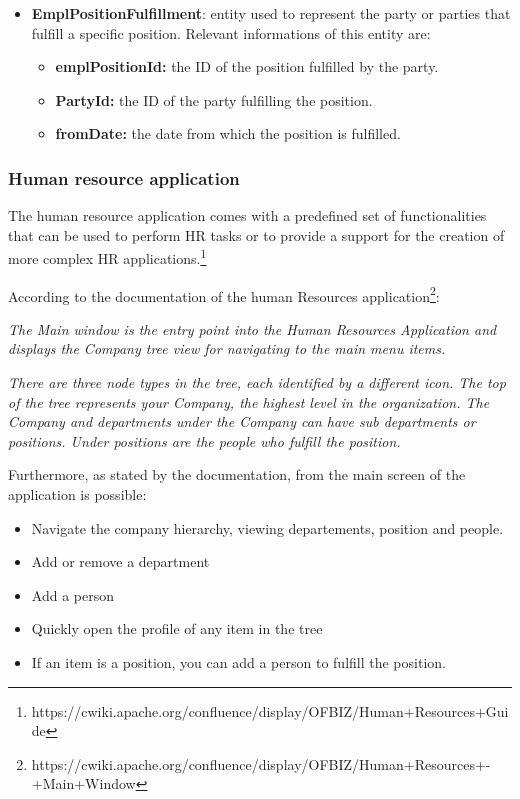 \begin{itemize}
	\item \textbf{EmplPositionFulfillment}: entity used to represent the party or parties that fulfill a specific position.
	Relevant informations of this entity are:

		\begin{itemize}
			\item \textbf{emplPositionId:} the ID of the position fulfilled by the party.
			\item \textbf{PartyId:} the ID of the party fulfilling the position.
			\item \textbf{fromDate:} the date from which the position is fulfilled.
		\end{itemize}
\end{itemize}

\subsubsection{Human resource application}

The human resource application comes with a predefined set of functionalities that can be used to perform HR tasks or to provide a support for the creation of more complex HR applications.\footnote{https://cwiki.apache.org/confluence/display/OFBIZ/Human+Resources+Guide} 

According to the documentation of the human Resources application\footnote{https://cwiki.apache.org/confluence/display/OFBIZ/Human+Resources+-+Main+Window}:

\textit{The Main window is the entry point into the Human Resources Application and displays the Company tree view for navigating to the main menu items.}

\textit{There are three node types in the tree, each identified by a different icon. The top of the tree represents your Company, the highest level in the organization. The Company and departments under the Company can have sub departments or positions. Under positions are the people who fulfill the position.}

Furthermore, as stated by the documentation, from the main screen of the application is possible:

\begin{itemize}
	\item Navigate the company hierarchy, viewing departements, position and people.
	\item Add or remove a department
	\item Add a person
	\item Quickly open the profile of any item in the tree
	\item If an item is a position, you can add a person to fulfill the position.
\end{itemize}

